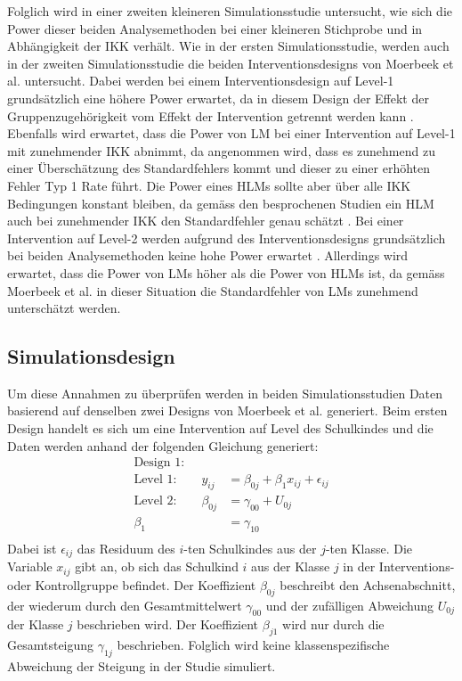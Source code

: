 \documentclass[12pt]{article}\usepackage[]{graphicx}\usepackage[]{color}
\begin{document}
Folglich wird in einer zweiten kleineren Simulationsstudie untersucht, wie sich die Power dieser beiden Analysemethoden bei einer kleineren Stichprobe und in Abhängigkeit der IKK verhält. Wie in der ersten Simulationsstudie, werden auch in der zweiten Simulationsstudie die beiden Interventionsdesigns von Moerbeek et al. \citeyearpar{MOERBEEK2003341} untersucht. Dabei werden bei einem Interventionsdesign auf Level-1 grundsätzlich eine höhere Power erwartet, da in diesem Design der Effekt der Gruppenzugehörigkeit vom Effekt der Intervention getrennt werden kann \citep{moerbeek2000design}. Ebenfalls wird erwartet, dass die Power von LM bei einer Intervention auf Level-1 mit zunehmender IKK abnimmt, da angenommen wird, dass es zunehmend zu einer Überschätzung des Standardfehlers kommt und dieser zu einer erhöhten Fehler Typ 1 Rate führt. Die Power eines HLMs sollte aber über alle IKK Bedingungen konstant bleiben, da gemäss den besprochenen Studien ein HLM auch bei zunehmender IKK den Standardfehler genau schätzt \citep{mcneish2014analyzing}. Bei einer Intervention auf Level-2 werden aufgrund des Interventionsdesigns grundsätzlich bei beiden Analysemethoden keine hohe Power erwartet \citep{moerbeek2000design}. Allerdings wird erwartet, dass die Power von LMs höher als die Power von HLMs ist, da gemäss Moerbeek et al. \citeyearpar{MOERBEEK2003341} in dieser Situation die Standardfehler von LMs zunehmend unterschätzt werden. 

\subsection{Simulationsdesign}
Um diese Annahmen zu überprüfen werden in beiden Simulationsstudien Daten basierend auf denselben zwei Designs von Moerbeek et al. \citeyearpar{MOERBEEK2003341} generiert. Beim ersten Design handelt es sich um eine Intervention auf Level des Schulkindes und die Daten werden anhand der folgenden Gleichung generiert:
\begin{equation} 
\begin{split}
\text{Design 1:}\\	
 \text{Level 1:}  \qquad y_{ij} & = \beta_{0j} + \beta_{1}x_{ij} + \epsilon_{ij}\\
 \text{Level 2:} \qquad \beta_{0j} & = \gamma_{00} + U_{0j}\\
 \beta_{1} & = \gamma_{10}\\
 \end{split}	
\end{equation} 
Dabei ist $\epsilon_{ij}$ das Residuum des $i$-ten Schulkindes aus der $j$-ten Klasse. Die Variable $x_{ij}$ gibt an, ob sich das Schulkind $i$ aus der Klasse $j$ in der Interventions- oder Kontrollgruppe befindet. Der Koeffizient $\beta_{0j}$ beschreibt den Achsenabschnitt, der wiederum durch den Gesamtmittelwert $\gamma_{00}$ und der zufälligen Abweichung $U_{0j}$ der Klasse $j$ beschrieben wird. Der Koeffizient $\beta_{j1}$ wird nur durch die Gesamtsteigung $\gamma_{1j}$ beschrieben. Folglich wird keine klassenspezifische Abweichung der Steigung in der Studie simuliert.
\end{document}
